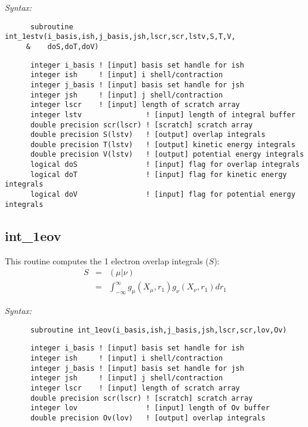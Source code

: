 
{\it Syntax:} 
\begin{verbatim} 
      subroutine int_1estv(i_basis,ish,j_basis,jsh,lscr,scr,lstv,S,T,V, 
     &    doS,doT,doV) 
\end{verbatim} 
\begin{verbatim} 
      integer i_basis ! [input] basis set handle for ish 
      integer ish     ! [input] i shell/contraction 
      integer j_basis ! [input] basis set handle for jsh 
      integer jsh     ! [input] j shell/contraction 
      integer lscr    ! [input] length of scratch array 
      integer lstv               ! [input] length of integral buffer 
      double precision scr(lscr) ! [scratch] scratch array 
      double precision S(lstv)   ! [output] overlap integrals 
      double precision T(lstv)   ! [output] kinetic energy integrals 
      double precision V(lstv)   ! [output] potential energy integrals 
      logical doS                ! [input] flag for overlap integrals 
      logical doT                ! [input] flag for kinetic energy integrals 
      logical doV                ! [input] flag for potential energy integrals 
\end{verbatim} 
\subsection{int\_1eov} 
This routine computes the 1 electron overlap integrals ($S$): 
\begin{eqnarray*} 
S & = & ({\mu}|{\nu}) \\ 
  & = & \int_{-\infty}^{\infty}g_{\mu}(X_{\mu},r_{1})g_{\nu}(X_{\nu},r_{1})dr_{1} 
\end{eqnarray*} 
 
{\it Syntax:} 
\begin{verbatim} 
      subroutine int_1eov(i_basis,ish,j_basis,jsh,lscr,scr,lov,Ov) 
\end{verbatim} 
\begin{verbatim} 
      integer i_basis ! [input] basis set handle for ish 
      integer ish     ! [input] i shell/contraction 
      integer j_basis ! [input] basis set handle for jsh 
      integer jsh     ! [input] j shell/contraction 
      integer lscr    ! [input] length of scratch array 
      double precision scr(lscr) ! [scratch] scratch array 
      integer lov                ! [input] length of Ov buffer 
      double precision Ov(lov)   ! [output] overlap integrals 
\end{verbatim} 
